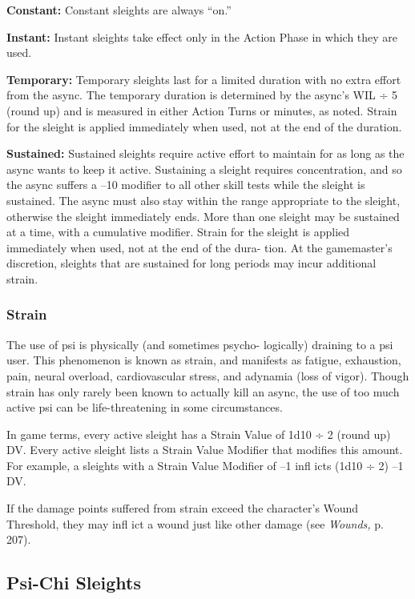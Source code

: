 \textbf{Constant:} Constant sleights are always ``on.''

\textbf{Instant:} Instant sleights take effect only in the 
Action Phase in which they are used.

\textbf{Temporary:} Temporary sleights last for a limited 
duration with no extra effort from the async. The 
temporary duration is determined by the async's WIL 
÷ 5 (round up) and is measured in either Action Turns 
or minutes, as noted. Strain for the sleight is applied 
immediately when used, not at the end of the duration.

\textbf{Sustained:} Sustained sleights require active effort 
to maintain for as long as the async wants to keep 
it active. Sustaining a sleight requires concentration, 
and so the async suffers a –10 modifier to all other 
skill tests while the sleight is sustained. The async 
must also stay within the range appropriate to the 
sleight, otherwise the sleight immediately ends. More 
than one sleight may be sustained at a time, with a 
cumulative modifier. Strain for the sleight is applied 
immediately when used, not at the end of the dura-
tion. At the gamemaster's discretion, sleights that are 
sustained for long periods may incur additional strain.

\subsubsection{Strain}

The use of psi is physically (and sometimes psycho-
logically) draining to a psi user. This phenomenon is 
known as strain, and manifests as fatigue, exhaustion, 
pain, neural overload, cardiovascular stress, and 
adynamia (loss of vigor). Though strain has only 
rarely been known to actually kill an async, the use 
of too much active psi can be life-threatening in some 
circumstances.

In game terms, every active sleight has a Strain 
Value of 1d10 ÷ 2 (round up) DV. Every active sleight 
lists a Strain Value Modifier that modifies this amount. 
For example, a sleights with a Strain Value Modifier 
of –1 infl icts (1d10 ÷ 2) –1 DV.

If the damage points suffered from strain exceed 
the character's Wound Threshold, they may infl ict a 
wound just like other damage (see \textit{Wounds,} p. 207).

\subsection{Psi-Chi Sleights}

